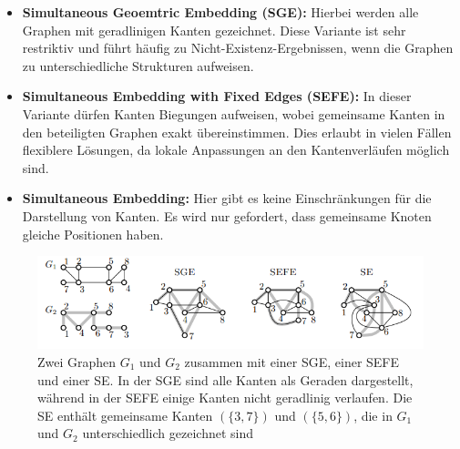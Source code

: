 \documentclass[bachelor, german]{algothesis}
\begin{document}
\begin{itemize}
    \item \textbf{Simultaneous Geoemtric Embedding (SGE):} Hierbei werden alle Graphen mit geradlinigen Kanten gezeichnet. Diese Variante ist sehr restriktiv und führt häufig zu Nicht-Existenz-Ergebnissen, wenn die Graphen zu unterschiedliche Strukturen aufweisen.
    \item  \textbf{Simultaneous Embedding with Fixed Edges (SEFE):} In dieser Variante dürfen Kanten Biegungen aufweisen, wobei gemeinsame Kanten in den beteiligten Graphen exakt übereinstimmen. Dies erlaubt in vielen Fällen flexiblere Lösungen, da lokale Anpassungen an den Kantenverläufen möglich sind.
    \item \textbf{Simultaneous Embedding:} Hier gibt es keine Einschränkungen für die Darstellung von Kanten. Es wird nur gefordert, dass gemeinsame Knoten gleiche Positionen haben.
\end{itemize}

\begin{figure}[ht]
    \centering
    \includegraphics{figures/Handbook1.png}
    \caption{Zwei Graphen $G_1$ und $G_2$ zusammen mit einer SGE, einer SEFE und einer SE. In der SGE sind alle Kanten als Geraden dargestellt, während in der SEFE einige Kanten nicht geradlinig verlaufen. Die SE enthält gemeinsame Kanten $(\{3,7\})$ und  $(\{5,6\})$, die in $G_1$ und $G_2$ unterschiedlich gezeichnet sind \protect\footnotemark}
    \label{fig:SE_Example}
\end{figure}
\end{document}
